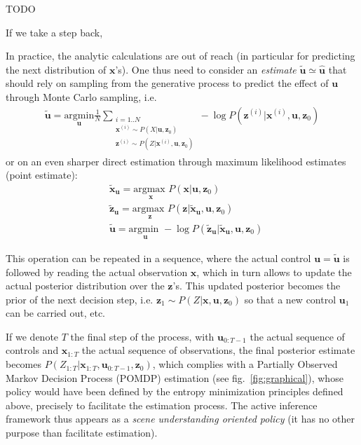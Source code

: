 \documentclass{article}
\begin{document}
 
TODO 
 
If we take a step back, 

In practice, the analytic calculations are out of reach (in particular for predicting the next distribution of $\boldsymbol{x}$'s).  One thus need to consider an \emph{estimate} $\tilde{\boldsymbol{u}} \simeq \hat{\boldsymbol{u}}$ that should rely on sampling from the generative process to 
predict the effect of $\boldsymbol{u}$ through Monte Carlo sampling,  i.e. 
\begin{align} \tilde{\boldsymbol{u}} = \underset{\boldsymbol{u}}{\text{argmin}} \frac{1}{N} \sum_{\substack{i = 1..N\\ \boldsymbol{x}^{(i)} \sim P(X|\boldsymbol{u}, \boldsymbol{z}_0)\\ \boldsymbol{z}^{(i)} \sim P(Z|\boldsymbol{x}^{(i)}, \boldsymbol{u}, \boldsymbol{z}_0)}} -\log P(\boldsymbol{z}^{(i)}| \boldsymbol{x}^{(i)}, \boldsymbol{u}, \boldsymbol{z}_0) \label{eq:MC} \end{align} or on an even sharper direct estimation through maximum likelihood estimates (point estimate):
\begin{align}
&\tilde{\boldsymbol{x}}_{\boldsymbol{u}} = \underset{\boldsymbol{x}}{\text{argmax }} P(\boldsymbol{x}|\boldsymbol{u}, \boldsymbol{z}_0) \label{eq:step-1}\\	
&\tilde{\boldsymbol{z}}_{\boldsymbol{u}} = \underset{\boldsymbol{z}}{\text{argmax }} P(\boldsymbol{z}|\tilde{\boldsymbol{x}}_{\boldsymbol{u}}, \boldsymbol{u}, \boldsymbol{z}_0) \label{eq:step-2}\\
&\tilde{\boldsymbol{u}} = \underset{\boldsymbol{u}}{\text{argmin }} - \log P(\tilde{\boldsymbol{z}}_{\boldsymbol{u}}|\tilde{\boldsymbol{x}}_{\boldsymbol{u}}, \boldsymbol{u}, \boldsymbol{z}_0)	\label{eq:step-3}
\end{align}


This operation can be repeated in a sequence, where the actual control $\boldsymbol{u} = \tilde{\boldsymbol{u}}$ is followed by reading the actual observation $\boldsymbol{x}$, which in turn allows to update the actual posterior distribution over the $\boldsymbol{z}$'s. This updated posterior becomes the prior of the next decision step, i.e. $\boldsymbol{z}_1\sim  P(Z|\boldsymbol{x}, \boldsymbol{u}, \boldsymbol{z}_0)$ so that a new control $\boldsymbol{u}_1$ can be carried out, etc. 

If we denote $T$ the final step of the process,  with $\boldsymbol{u}_{0:T-1}$ the actual sequence of controls and $\boldsymbol{x}_{1:T}$ the actual sequence of observations, the final posterior estimate becomes $P(Z_{1:T}|\boldsymbol{x}_{1:T}, \boldsymbol{u}_{0:T-1}, \boldsymbol{z}_0)$, which complies with a Partially Observed Markov Decision Process (POMDP) estimation (see fig.~\ref{fig:graphical}), whose policy would have been defined by the entropy minimization principles defined above, precisely to facilitate the estimation process. The active inference framework thus appears  as a \emph{scene understanding oriented policy} (it has no other purpose than facilitate estimation).
\end{document}
